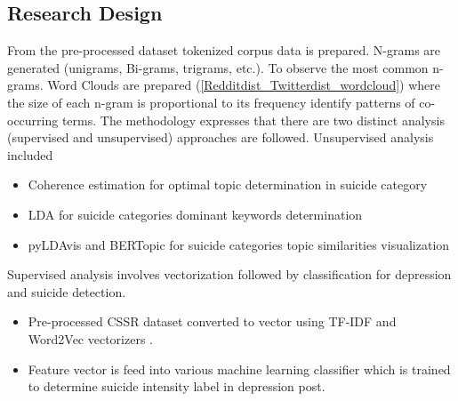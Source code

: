 \documentclass[sn-mathphys,Numbered]{sn-jnl}%
\theoremstyle{thmstyleone}%
\theoremstyle{thmstyletwo}%
\theoremstyle{thmstylethree}%
\begin{document}
\subsection{Research Design}
From the pre-processed dataset tokenized corpus data is prepared. N-grams are generated (unigrams, Bi-grams, trigrams, etc.). To observe the most common n-grams. Word Clouds are prepared (\ref{Redditdist_Twitterdist_wordcloud}) where the size of each n-gram is proportional to its frequency identify patterns of co-occurring terms. 
The methodology expresses that there are two distinct analysis (supervised and unsupervised) approaches are followed. 
Unsupervised analysis included 
\begin{itemize}
\item Coherence estimation for optimal topic determination in suicide category
\item LDA for suicide categories dominant keywords determination
\item pyLDAvis and BERTopic for suicide categories topic similarities visualization
\end{itemize}
Supervised analysis involves vectorization followed by classification for depression and suicide detection. 
\begin{itemize}
\item Pre-processed CSSR dataset converted to vector using TF-IDF and Word2Vec vectorizers \cite{aldhyani2022detecting, wang2020depression, shetty2020predicting}. 
\item Feature vector is feed into various machine learning classifier which is trained to determine suicide intensity label in depression post.  
\end{itemize}
\end{document}
